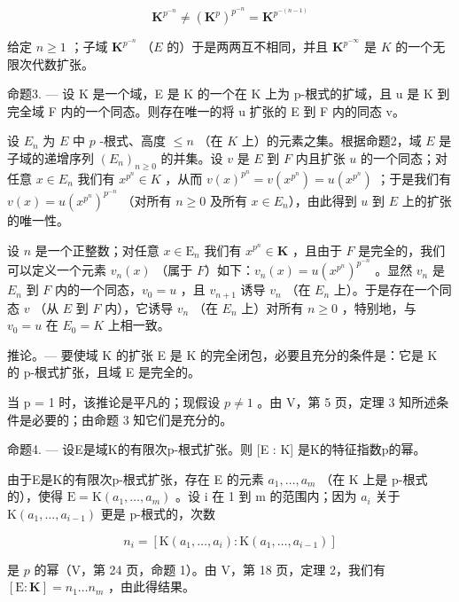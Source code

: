 \[
\mathbf {K} ^ {p ^ {- n}} \neq (\mathbf {K} ^ {p}) ^ {p ^ {- n}} = \mathbf {K} ^ {p ^ {- (n - 1)}}
\]

给定 \(n \geqslant 1\) ；子域 \(\mathbf{K}^{p^{-n}}\) （\(E\) 的）于是两两互不相同，并且 \(\mathbf{K}^{p^{-\infty}}\) 是 \(K\) 的一个无限次代数扩张。

命题3. --- 设 K 是一个域，E 是 K 的一个在 K 上为 p-根式的扩域，且 u 是 K 到完全域 F 内的一个同态。则存在唯一的将 u 扩张的 E 到 F 内的同态 v。

设 \(E_n\) 为 \(E\) 中 \(p\) -根式、高度 \(\leqslant n\) （在 \(K\) 上）的元素之集。根据命题2，域 \(E\) 是子域的递增序列 \((E_n)_{n \geqslant 0}\) 的并集。设 \(v\) 是 \(E\) 到 \(F\) 内且扩张 \(u\) 的一个同态；对任意 \(x \in E_n\) 我们有 \(x^{p^n} \in K\) ，从而 \(v(x)^{p^n} = v(x^{p^n}) = u(x^{p^n})\) ；于是我们有 \(v(x) = u(x^{p^n})^{p^{-n}}\) （对所有 \(n \geqslant 0\) 及所有 \(x \in E_n\)），由此得到 \(u\) 到 \(E\) 上的扩张的唯一性。

设 \(n\) 是一个正整数；对任意 \(x \in \mathrm{E}_n\) 我们有 \(x^{p^n} \in \mathbf{K}\) ，且由于 \(F\) 是完全的，我们可以定义一个元素 \(v_n(x)\) （属于 \(F\)）如下：\(v_n(x) = u(x^{p^n})^{p^{-n}}\) 。显然 \(v_n\) 是 \(E_n\) 到 \(F\) 内的一个同态，\(v_0 = u\) ，且 \(v_{n+1}\) 诱导 \(v_n\) （在 \(E_n\) 上）。于是存在一个同态 \(v\) （从 \(E\) 到 \(F\) 内），它诱导 \(v_n\) （在 \(E_n\) 上）对所有 \(n \geqslant 0\) ，特别地，与 \(v_0 = u\) 在 \(E_0 = K\) 上相一致。

推论。--- 要使域 K 的扩张 E 是 K 的完全闭包，必要且充分的条件是：它是 K 的 p-根式扩张，且域 E 是完全的。

当 p = 1 时，该推论是平凡的；现假设 \(p \neq 1\) 。由 V，第 5 页，定理 3 知所述条件是必要的；由命题 3 知它们是充分的。

命题4. --- 设E是域K的有限次p-根式扩张。则 {[}E : K{]} 是K的特征指数p的幂。

由于E是K的有限次p-根式扩张，存在 E 的元素 \(a_{1}, \ldots, a_{m}\) （在 K 上是 p-根式的），使得 \(\mathrm{E} = \mathrm{K}(a_{1}, \ldots, a_{m})\) 。设 i 在 1 到 m 的范围内；因为 \(a_{i}\) 关于 \(\mathrm{K}(a_{1}, \ldots, a_{i-1})\) 更是 p-根式的，次数

\[
n _ {i} = \left[ \mathrm{K} (a _ {1}, \dots , a _ {i}): \mathrm{K} (a _ {1}, \dots , a _ {i - 1}) \right]
\]

是 \(p\) 的幂（V，第 24 页，命题 1）。由 V，第 18 页，定理 2，我们有 \([\mathrm{E}:\mathbf{K}] = n_1\ldots n_m\) ，由此得结果。

